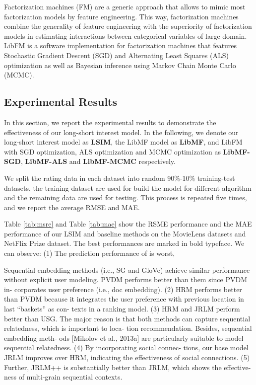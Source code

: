 \documentclass{sig-alternate-05-2015}
\begin{document}
Factorization machines (FM) are a generic approach that
allows to mimic most factorization models by feature engineering.
This way, factorization machines combine the generality of
feature engineering with the superiority of factorization models
in estimating interactions between categorical variables of large domain.
LibFM \cite{rendle2012factorization} is a software implementation
for factorization machines that features
Stochastic Gradient Descent (SGD) and
Alternating Least Squares (ALS) optimization as well as
Bayesian inference using Markov Chain Monte Carlo (MCMC).

\subsection{Experimental Results}
In this section, we report the experimental results to demonstrate
the effectiveness of our long-short interest model.
In the following, we denote our long-short interest model as \textbf{LSIM},
the LibMF model as \textbf{LibMF}, and LibFM with SGD optimization,
ALS optimization and MCMC optimization as \textbf{LibMF-SGD},
\textbf{LibMF-ALS} and \textbf{LibMF-MCMC} respectively.

We split the rating data in each dataset into random 90\%-10\% training-test datasets,
the training dataset are used for build the model for different algorithm and
the remaining data are used for testing. This process is repeated five times,
and we report the average RMSE and MAE.

Table \ref{tab:msre} and Table \ref{tab:mae} show the RSME performance and the MAE performance
of our LSIM and baseline methods on the MovieLens datasets and NetFlix Prize dataset.
The best performances are marked in bold typeface.
We can observe:
(1) The prediction performance of  is worst, 

Sequential embedding methods (i.e., SG and GloVe) achieve similar performance without explicit user modeling. PVDM performs better than them since PVDM in- corporates user preference (i.e., doc embedding).
(2) HRM performs better than PVDM because it integrates the user preference with previous location in last “baskets” as con- texts in a ranking model.
(3) HRM and JRLM perform better than USG. The major reason is that both methods can capture sequential relatedness, which is important to loca- tion recommendation. Besides, sequential embedding meth- ods [Mikolov et al., 2013a] are particularly suitable to model sequential relatedness.
(4) By incorporating social connec- tions, our base model JRLM improves over HRM, indicating the effectiveness of social connections.
(5) Further, JRLM++ is substantially better than JRLM, which shows the effective- ness of multi-grain sequential contexts.
\end{document}

